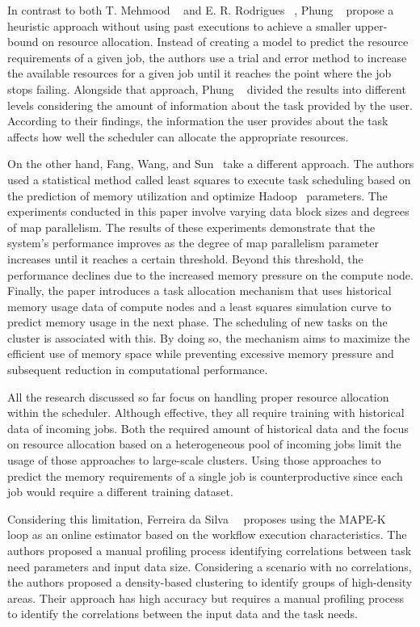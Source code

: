 In contrast to both T. Mehmood \etal~\cite{mehmood2018} and E. R. Rodrigues \etal~\cite{rodrigues2016}, Phung \etal~\cite{phung2021} propose a heuristic approach without using past executions to achieve a smaller upper-bound on resource allocation.
Instead of creating a model to predict the resource requirements of a given job, the authors use a trial and error method to increase the available resources for a given job until it reaches the point where the job stops failing.
Alongside that approach,  Phung \etal~\cite{phung2021} divided the results into different levels considering the amount of information about the task provided by the user.
According to their findings, the information the user provides about the task affects how well the scheduler can allocate the appropriate resources.

On the other hand, Fang, Wang, and Sun~\cite{fang2018} take a different approach.
The authors used a statistical method called least squares to execute task scheduling based on the prediction of memory utilization and optimize Hadoop~\cite{hadoop} parameters.
The experiments conducted in this paper involve varying data block sizes and degrees of map parallelism.
The results of these experiments demonstrate that the system's performance improves as the degree of map parallelism parameter increases until it reaches a certain threshold.
Beyond this threshold, the performance declines due to the increased memory pressure on the compute node.
Finally, the paper introduces a task allocation mechanism that uses historical memory usage data of compute nodes and a least squares simulation curve to predict memory usage in the next phase.
The scheduling of new tasks on the cluster is associated with this.
By doing so, the mechanism aims to maximize the efficient use of memory space while preventing excessive memory pressure and subsequent reduction in computational performance.

All the research discussed so far focus on handling proper resource allocation within the scheduler.
Although effective, they all require training with historical data of incoming jobs.
Both the required amount of historical data and the focus on resource allocation based on a heterogeneous pool of incoming jobs limit the usage of those approaches to large-scale clusters.
Using those approaches to predict the memory requirements of a single job is counterproductive since each job would require a different training dataset.

Considering this limitation, Ferreira da Silva~\etal~\cite{ferreira2013} proposes using the \ac{MAPE-K}~\cite{mapek} loop as an online estimator based on the workflow execution characteristics.
The authors proposed a manual profiling process identifying correlations between task need parameters and input data size.
Considering a scenario with no correlations, the authors proposed a density-based clustering to identify groups of high-density areas.
Their approach has high accuracy but requires a manual profiling process to identify the correlations between the input data and the task needs.

